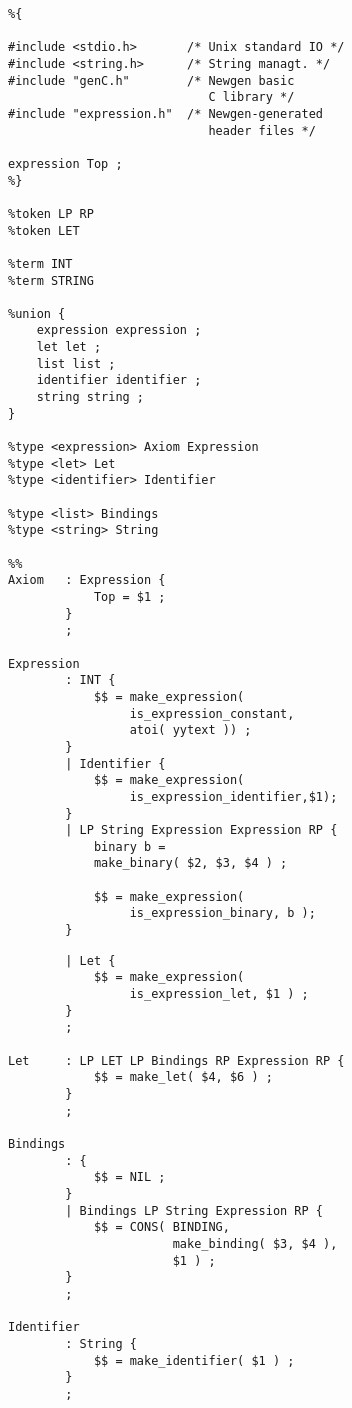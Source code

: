 \documentclass[11pt]{article}
\begin{document}
{\newpage

\vskip 2cm

\begin{verbatim}
%{

#include <stdio.h>       /* Unix standard IO */
#include <string.h>      /* String managt. */
#include "genC.h"        /* Newgen basic 
                            C library */
#include "expression.h"  /* Newgen-generated 
                            header files */ 

expression Top ;
%}

%token LP RP 
%token LET 

%term INT
%term STRING

%union {
    expression expression ;
    let let ;
    list list ;
    identifier identifier ;
    string string ;
}

%type <expression> Axiom Expression
%type <let> Let
%type <identifier> Identifier

%type <list> Bindings
%type <string> String 

%% 
Axiom   : Expression {
            Top = $1 ;
        }
        ;

Expression  
        : INT {
            $$ = make_expression(
                 is_expression_constant, 
                 atoi( yytext )) ;
        } 
        | Identifier {
            $$ = make_expression( 
                 is_expression_identifier,$1);
        } 
        | LP String Expression Expression RP {
            binary b = 
            make_binary( $2, $3, $4 ) ; 
               
            $$ = make_expression(
                 is_expression_binary, b );
        }
\end{verbatim}

\newpage

\vskip 2cm

\begin{verbatim}
        | Let {
            $$ = make_expression( 
                 is_expression_let, $1 ) ;
        } 
        ; 
 
Let     : LP LET LP Bindings RP Expression RP {
            $$ = make_let( $4, $6 ) ;
        } 
        ; 
 
Bindings   
        : {
            $$ = NIL ;
        } 
        | Bindings LP String Expression RP {
            $$ = CONS( BINDING,
                       make_binding( $3, $4 ), 
                       $1 ) ;
        } 
        ; 
 
Identifier  
        : String {
            $$ = make_identifier( $1 ) ;
        }
        ;


\end{verbatim}}
\end{document}
